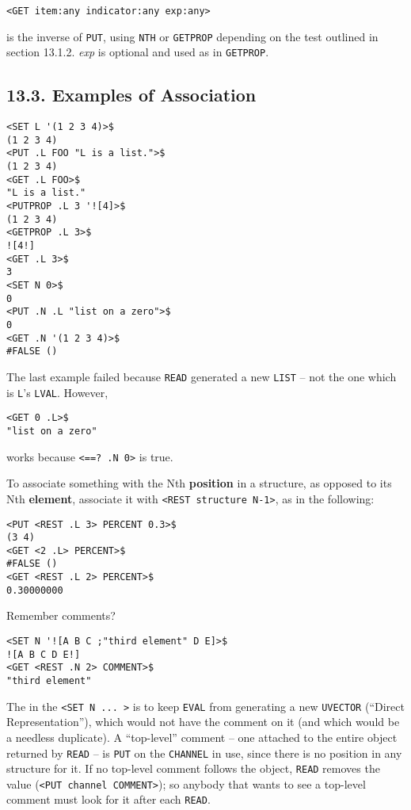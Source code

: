 \documentclass[a4paper,]{article}
\begin{document}
\begin{verbatim}
<GET item:any indicator:any exp:any>
\end{verbatim}

 is the inverse of \texttt{PUT}, using \texttt{NTH} or \texttt{GETPROP} depending on the test
outlined in section 13.1.2. \emph{exp} is optional and used as in \texttt{GETPROP}.

\subsection{13.3. Examples of Association}\label{examples-of-association}

\begin{verbatim}
<SET L '(1 2 3 4)>$
(1 2 3 4)
<PUT .L FOO "L is a list.">$
(1 2 3 4)
<GET .L FOO>$
"L is a list."
<PUTPROP .L 3 '![4]>$
(1 2 3 4)
<GETPROP .L 3>$
![4!]
<GET .L 3>$
3
<SET N 0>$
0
<PUT .N .L "list on a zero">$
0
<GET .N '(1 2 3 4)>$
#FALSE ()
\end{verbatim}

The last example failed because \texttt{READ}  generated a new \texttt{LIST} -- not the one which is
\texttt{L}'s \texttt{LVAL}. However,

\begin{verbatim}
<GET 0 .L>$
"list on a zero"
\end{verbatim}

works because \texttt{\textless{}==?\ .N\ 0\textgreater{}} is true.

To associate something with the Nth \textbf{position} in a structure, as opposed to its Nth \textbf{element}, associate it
with \texttt{\textless{}REST\ structure\ N-1\textgreater{}}, as in the following:

\begin{verbatim}
<PUT <REST .L 3> PERCENT 0.3>$
(3 4)
<GET <2 .L> PERCENT>$
#FALSE ()
<GET <REST .L 2> PERCENT>$
0.30000000
\end{verbatim}

Remember comments? 

\begin{verbatim}
<SET N '![A B C ;"third element" D E]>$
![A B C D E!]
<GET <REST .N 2> COMMENT>$
"third element"
\end{verbatim}

The \texttt{\textquotesingle{}} in the \texttt{\textless{}SET\ N\ ...\ \textgreater{}} is to keep \texttt{EVAL} from
generating a new \texttt{UVECTOR} (``Direct Representation''), which would not have the comment on it (and which would be a
needless duplicate). A ``top-level'' comment -- one attached to the entire object returned by \texttt{READ} -- is
\texttt{PUT} on the \texttt{CHANNEL}  in use, since there is no position in any structure for it.
If no top-level comment follows the object, \texttt{READ} removes the value
(\texttt{\textless{}PUT\ channel\ COMMENT\textgreater{}}); so anybody that wants to see a top-level comment must look for
it after each \texttt{READ}.
\end{document}
